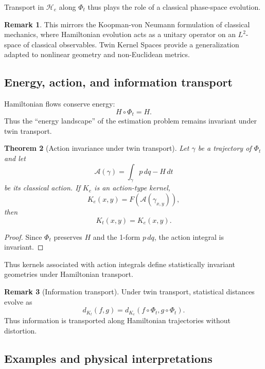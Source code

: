 \documentclass[11pt]{article}
\newtheorem{theorem}{Theorem}[section]
\theoremstyle{definition}
\newtheorem{remark}[theorem]{Remark}
\begin{document}
Transport in $\mathcal{H}_e$ along $\Phi_t$ thus plays the role of a classical phase-space evolution.

\begin{remark}
	This mirrors the Koopman-von Neumann formulation of classical mechanics, where Hamiltonian evolution acts as a unitary operator on an $L^2$-space of classical observables.
	Twin Kernel Spaces provide a generalization adapted to nonlinear geometry and non-Euclidean metrics.
\end{remark}

\subsection{Energy, action, and information transport}

Hamiltonian flows conserve energy:
\[
H\circ \Phi_t = H.
\]
Thus the “energy landscape” of the estimation problem remains invariant under twin transport.

\begin{theorem}[Action invariance under twin transport]
	Let $\gamma$ be a trajectory of $\Phi_t$ and let
	\[
	\mathcal{A}(\gamma)=\int_\gamma p\,dq - H\,dt
	\]
	be its classical action.
	If $K_e$ is an action-type kernel,
	\[
	K_e(x,y) = F(\mathcal{A}(\gamma_{x,y})),
	\]
	then
	\[
	K_t(x,y)=K_e(x,y).
	\]
\end{theorem}

\begin{proof}
	Since $\Phi_t$ preserves $H$ and the 1-form $p\,dq$, the action integral is invariant.
\end{proof}

Thus kernels associated with action integrals define statistically invariant geometries under Hamiltonian transport.

\begin{remark}[Information transport]
	Under twin transport, statistical distances evolve as
	\[
	d_{K_t}(f,g)=d_{K_e}(f\circ\Phi_t, g\circ \Phi_t).
	\]
	Thus information is transported along Hamiltonian trajectories without distortion.
\end{remark}

\subsection{Examples and physical interpretations}
\end{document}
